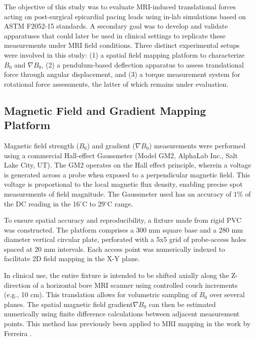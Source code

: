

The objective of this study was to evaluate MRI-induced translational forces acting on post-surgical epicardial pacing leads using in-lab simulations based on ASTM F2052-15 standards. A secondary goal was to develop and validate apparatuses that could later be used in clinical settings to replicate these measurements under MRI field conditions. Three distinct experimental setups were involved in this study: (1) a spatial field mapping platform to characterize $B_0$ and $\nabla B_0$, (2) a pendulum-based deflection apparatus to assess translational force through angular displacement, and (3) a torque measurement system for rotational force assessments, the latter of which remains under evaluation.

\subsection{Magnetic Field and Gradient Mapping Platform}

Magnetic field strength ($B_0$) and gradient ($\nabla B_0$) measurements were performed using a commercial Hall-effect Gaussmeter (Model GM2, AlphaLab Inc., Salt Lake City, UT).  The GM2 operates on the Hall effect principle, wherein a voltage is generated across a probe when exposed to a perpendicular magnetic field. This voltage is proportional to the local magnetic flux density, enabling precise spot measurements of field magnitude. The Gaussmeter used has an accuracy of 1\% of the DC reading in the 16$^\circ$C to 29$^\circ$C range.

To ensure spatial accuracy and reproducibility, a fixture made from rigid PVC was constructed. The platform comprises a 300 mm square base and a 280 mm diameter vertical circular plate, perforated with a 5x5 grid of probe-access holes spaced at 20 mm intervals. Each access point was numerically indexed to facilitate 2D field mapping in the X-Y plane.

In clinical use, the entire fixture is intended to be shifted axially along the Z-direction of a horizontal bore MRI scanner using controlled couch increments (e.g., 10 cm). This translation allows for volumetric sampling of $B_0$ over several planes. The spatial magnetic field gradient$\nabla B_0$ can then be estimated numerically using finite difference calculations between adjacent measurement points. This method has previously been applied to MRI mapping in the work by Ferreira \cite{ferreira2017}.

